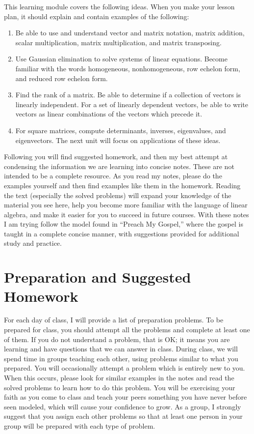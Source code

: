 \documentclass[10pt]{article}
\newcommand{\mytitle}{Arithmetic}
\begin{document}
\noindent{\huge{\bf \mytitle}}

\noindent
This learning module covers the following ideas.  When you make your lesson plan, it should explain and contain examples of the following:
\begin{enumerate}

\item Be able to use and understand vector and matrix notation, matrix addition, scalar multiplication, matrix multiplication, and matrix transposing.
\item Use Gaussian elimination to solve systems of linear equations. Become familiar with the words homogeneous, nonhomogeneous, row echelon form, and reduced row echelon form. 
\item Find the rank of a matrix. Be able to determine if a collection of vectors is linearly independent. For a set of linearly dependent vectors, be able to write vectors as linear combinations of the vectors which precede it.
\item For square matrices, compute determinants, inverses, eigenvalues, and eigenvectors. The next unit will focus on applications of these ideas.

\end{enumerate}


Following you will find suggested homework, and then my best attempt at condensing the information we are learning into  concise notes.  These are not intended to be a complete resource. As you read my notes, please do the examples yourself and then find examples like them in the homework. Reading the text (especially the solved problems) will expand your knowledge of the material you see here, help you become more familiar with the language of linear algebra, and make it easier for you to succeed in future courses. With these notes I am trying follow the model found in ``Preach My Gospel,'' where the gospel is taught in a complete concise manner, with suggestions provided for additional study and practice. 

\section{Preparation and Suggested Homework}
For each day of class, I will provide a list of preparation problems. To be prepared for class, you should attempt all the problems and complete at least one of them. If you do not understand a problem, that is OK; it means you are learning and have questions that we can answer in class.   
During class, we will spend time in groups teaching each other, using problems similar to what you prepared. 
You will occasionally attempt a problem which is entirely new to you. When this occurs, please look for similar examples in the notes and read the solved problems to learn how to do this problem. You will be exercising your faith as you come to class and teach your peers something you have never before seen modeled, which will cause your confidence to grow. As a group, I strongly suggest that you assign each other problems so that at least one person in your group will be prepared with each type of problem.
\end{document}
